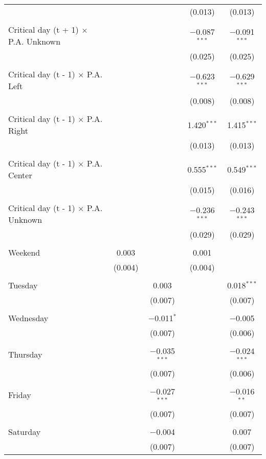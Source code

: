 \documentclass[
]{article}
\begin{document}
\begin{table}[!htbp]
{\begin{tabular}{@{\extracolsep{5pt}}lcccc}
  &  &  & (0.013) & (0.013) \\ 
  & & & & \\ 
 Critical day (t + 1) $\times$ P.A. Unknown &  &  & $-$0.087$^{***}$ & $-$0.091$^{***}$ \\ 
  &  &  & (0.025) & (0.025) \\ 
  & & & & \\ 
 Critical day (t - 1) $\times$ P.A. Left &  &  & $-$0.623$^{***}$ & $-$0.629$^{***}$ \\ 
  &  &  & (0.008) & (0.008) \\ 
  & & & & \\ 
 Critical day (t - 1) $\times$ P.A. Right &  &  & 1.420$^{***}$ & 1.415$^{***}$ \\ 
  &  &  & (0.013) & (0.013) \\ 
  & & & & \\ 
 Critical day (t - 1) $\times$ P.A. Center &  &  & 0.555$^{***}$ & 0.549$^{***}$ \\ 
  &  &  & (0.015) & (0.016) \\ 
  & & & & \\ 
 Critical day (t - 1) $\times$ P.A. Unknown &  &  & $-$0.236$^{***}$ & $-$0.243$^{***}$ \\ 
  &  &  & (0.029) & (0.029) \\ 
  & & & & \\ 
 Weekend & 0.003 &  & 0.001 &  \\ 
  & (0.004) &  & (0.004) &  \\ 
  & & & & \\ 
 Tuesday &  & 0.003 &  & 0.018$^{***}$ \\ 
  &  & (0.007) &  & (0.007) \\ 
  & & & & \\ 
 Wednesday &  & $-$0.011$^{*}$ &  & $-$0.005 \\ 
  &  & (0.007) &  & (0.006) \\ 
  & & & & \\ 
 Thursday &  & $-$0.035$^{***}$ &  & $-$0.024$^{***}$ \\ 
  &  & (0.007) &  & (0.006) \\ 
  & & & & \\ 
 Friday &  & $-$0.027$^{***}$ &  & $-$0.016$^{**}$ \\ 
  &  & (0.007) &  & (0.007) \\ 
  & & & & \\ 
 Saturday &  & $-$0.004 &  & 0.007 \\ 
  &  & (0.007) &  & (0.007) \\ 

\end{tabular}}
\end{table}
\end{document}
